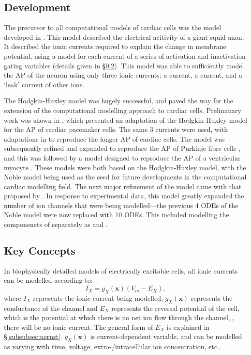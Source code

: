 \documentclass[../thesis-main.tex]{subfiles}
\begin{document}
 \subsection{Development}
 \label{subsec:model-development}
 The precursor to all computational models of cardiac cells was the model developed in \citet{Hodgkin1952}. This model described the electrical acitivity of a giant squid axon. It described the ionic currents required to explain the change in membrane potential, using a model for each current of a series of activation and inactivation gating variables (details given in \S\ref{subsec:model-concepts}). This model was able to sufficiently model the AP of the neuron using only three ionic currents: a \K{} current, a \na{} current, and a `leak' current of other ions.
 
 The Hodgkin-Huxley model was hugely successful, and paved the way for the extension of the computational modelling approach to cardiac cells. Preliminary work was shown in \citet{Noble1960}, which presented an adaptation of the Hodgkin-Huxley model for the AP of cardiac pacemaker cells. The same 3 currents were used, with adaptations in \ik{} to reproduce the longer AP of cardiac cells. The model was subsequently refined and expanded to reproduce the AP of Purkinje fibre cells \citep{Noble1962}, and this was followed by a model designed to reproduce the AP of a ventricular myocyte \citep{Krause1966}. These models were both based on the Hodgkin-Huxley model, with the Noble model being used as the seed for future developments in the computational cardiac modelling field. The next major refinement of the model came with that proposed by \citet{McAllister1975}. In response to experimental data, this model greatly expanded the number of ion channels that were being modelled---the previous 4 ODEs of the Noble model were now replaced with 10 ODEs. This included modelling the componenets of \ik{} separately as \ikr{} and \iks{}.
 
 \subsection{Key Concepts}
 \label{subsec:model-concepts}
 In biophysically detailed models of electrically excitable cells, all ionic currents can be modelled according to:
 \begin{equation}
  I_X = g_X(\mathbf{x})(V_m-E_X),
 \end{equation}
 where $I_X$ represents the ionic current being modelled, $g_X(\mathbf{x})$ represents the conductance of the channel and $E_X$ represents the reversal potential of the cell, which is the potential at which there is no net ion flow through the channel, \idest, there will be no ionic current. The general form of $E_X$ is explained in \S\ref{subsubsec:nernst}. $g_X(\mathbf{x})$ is current-dependent variable, and can be modelled as varying with time, voltage, extra-/intracellular ion concentration, etc..
 
\end{document}
